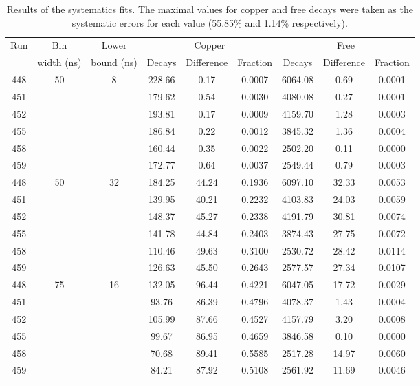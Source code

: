 \begin{table}
  \begin{center}
  \begin{tabular}{c | c | c | c | c | c | c | c | c}
    \multirow{2}{*}{Run}  &  
          Bin         &  Lower       & \multicolumn{3}{c|}{Copper}     & \multicolumn{3}{c}{Free}       \\
       &  width (ns)  &  bound (ns)  & Decays & Difference & Fraction  & Decays & Difference & Fraction \\
    \hline
     448  & \multirow{6}{*}{50} & \multirow{6}{*}{8} 
              &  228.66  &    0.17  &  0.0007  &  6064.08  &    0.69  &  0.0001 \\ 
     451  & & &  179.62  &    0.54  &  0.0030  &  4080.08  &    0.27  &  0.0001 \\ 
     452  & & &  193.81  &    0.17  &  0.0009  &  4159.70  &    1.28  &  0.0003 \\ 
     455  & & &  186.84  &    0.22  &  0.0012  &  3845.32  &    1.36  &  0.0004 \\ 
     458  & & &  160.44  &    0.35  &  0.0022  &  2502.20  &    0.11  &  0.0000 \\ 
     459  & & &  172.77  &    0.64  &  0.0037  &  2549.44  &    0.79  &  0.0003 \\ 
    \hline
    448  & \multirow{6}{*}{50} & \multirow{6}{*}{32} 
             &  184.25  &   44.24  &  0.1936  &  6097.10  &   32.33  &  0.0053 \\ 
    451  & & &  139.95  &   40.21  &  0.2232  &  4103.83  &   24.03  &  0.0059 \\ 
    452  & & &  148.37  &   45.27  &  0.2338  &  4191.79  &   30.81  &  0.0074 \\ 
    455  & & &  141.78  &   44.84  &  0.2403  &  3874.43  &   27.75  &  0.0072 \\ 
    458  & & &  110.46  &   49.63  &  0.3100  &  2530.72  &   28.42  &  0.0114 \\ 
    459  & & &  126.63  &   45.50  &  0.2643  &  2577.57  &   27.34  &  0.0107 \\
    \hline
    448  & \multirow{6}{*}{75} & \multirow{6}{*}{16} 
             &  132.05  &   96.44  &  0.4221  &  6047.05  &   17.72  &  0.0029 \\ 
    451  & & &   93.76  &   86.39  &  0.4796  &  4078.37  &    1.43  &  0.0004 \\ 
    452  & & &  105.99  &   87.66  &  0.4527  &  4157.79  &    3.20  &  0.0008 \\ 
    455  & & &   99.67  &   86.95  &  0.4659  &  3846.58  &    0.10  &  0.0000 \\ 
    458  & & &   70.68  &   89.41  &  0.5585  &  2517.28  &   14.97  &  0.0060 \\ 
    459  & & &   84.21  &   87.92  &  0.5108  &  2561.92  &   11.69  &  0.0046 \\
  \end{tabular}
  \end{center}
  \caption{Results of the systematics fits. The maximal values for copper and free decays were taken as the systematic errors for each value (55.85\% and 1.14\% respectively).}
  \label{tab:systematic_fits}
\end{table}

